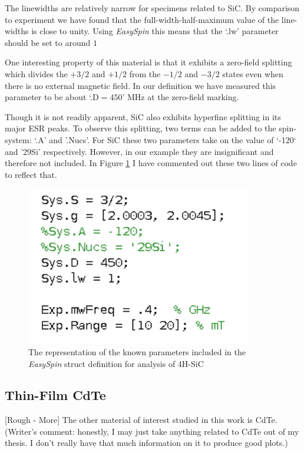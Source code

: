 \documentclass[oneside, astronomy, noacknowlegments]{BYUPhys}
\begin{document}
The linewidths are relatively narrow for specimens related to SiC. By comparison to experiment we have found that the full-width-half-maximum value of the line-widths is close to unity. Using \textit{EasySpin} this means that the `.lw' parameter should be set to around $1$

One interesting property of this material is that it exhibits a zero-field splitting which divides the $+3/2$ and $+1/2$ from the $-1/2$ and $-3/2$ states even when there is no external magnetic field. In our definition we have measured this parameter to be about `.D$=450$' MHz at the zero-field marking.

Though it is not readily apparent, SiC also exhibits hyperfine splitting in its major ESR peaks. To observe this splitting, two terms can be added to the spin-system: `.A' and '.Nucs'. For SiC these two parameters take on the value of `-120` and '29Si' respectively. However, in our example they are insignificant and therefore not included. In Figure \ref{fig:SiCParams} I have commented out these two lines of code to reflect that.

\begin{figure}
    \centerline{\includegraphics{sic_params_commented_fig}}
    \caption[The \textit{EasySpin} representation of SiC]{\label{fig:SiCParams}
     The representation of the known parameters included in the \textit{EasySpin} struct definition for analysis of 4H-SiC}
 \end{figure}
 
\subsection{Thin-Film CdTe}

[Rough - More] The other material of interest studied in this work is CdTe. (Writer's comment: honestly, I may just take anything related to CdTe out of my thesis. I don't really have that much information on it to produce good plots.)
\end{document}
